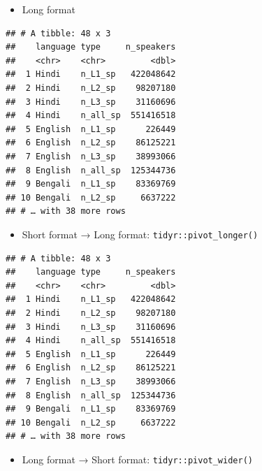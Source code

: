 \documentclass[
]{book}
\newenvironment{Shaded}{\begin{snugshade}}{\end{snugshade}}
\newcommand{\DataTypeTok}[1]{\textcolor[rgb]{0.13,0.29,0.53}{#1}}
\newcommand{\KeywordTok}[1]{\textcolor[rgb]{0.13,0.29,0.53}{\textbf{#1}}}
\newcommand{\NormalTok}[1]{#1}
\newcommand{\OperatorTok}[1]{\textcolor[rgb]{0.81,0.36,0.00}{\textbf{#1}}}
\newcommand{\StringTok}[1]{\textcolor[rgb]{0.31,0.60,0.02}{#1}}
\providecommand{\tightlist}{%
  \setlength{\itemsep}{0pt}\setlength{\parskip}{0pt}}
\begin{document}
\begin{itemize}
\tightlist
\item
  Long format
\end{itemize}

\begin{verbatim}
## # A tibble: 48 x 3
##    language type     n_speakers
##    <chr>    <chr>         <dbl>
##  1 Hindi    n_L1_sp   422048642
##  2 Hindi    n_L2_sp    98207180
##  3 Hindi    n_L3_sp    31160696
##  4 Hindi    n_all_sp  551416518
##  5 English  n_L1_sp      226449
##  6 English  n_L2_sp    86125221
##  7 English  n_L3_sp    38993066
##  8 English  n_all_sp  125344736
##  9 Bengali  n_L1_sp    83369769
## 10 Bengali  n_L2_sp     6637222
## # … with 38 more rows
\end{verbatim}

\begin{itemize}
\tightlist
\item
  Short format → Long format: \texttt{tidyr::pivot\_longer()}
\end{itemize}

\begin{Shaded}
\end{Shaded}

\begin{verbatim}
## # A tibble: 48 x 3
##    language type     n_speakers
##    <chr>    <chr>         <dbl>
##  1 Hindi    n_L1_sp   422048642
##  2 Hindi    n_L2_sp    98207180
##  3 Hindi    n_L3_sp    31160696
##  4 Hindi    n_all_sp  551416518
##  5 English  n_L1_sp      226449
##  6 English  n_L2_sp    86125221
##  7 English  n_L3_sp    38993066
##  8 English  n_all_sp  125344736
##  9 Bengali  n_L1_sp    83369769
## 10 Bengali  n_L2_sp     6637222
## # … with 38 more rows
\end{verbatim}

\begin{itemize}
\tightlist
\item
  Long format → Short format: \texttt{tidyr::pivot\_wider()}
\end{itemize}
\end{document}
